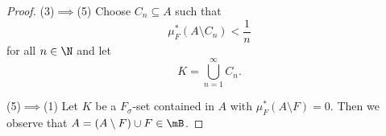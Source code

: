 \documentclass[pmath451]{subfiles}
\begin{document}
\begin{proof}
        (3)$\implies$(5) Choose $C_n\subseteq A$ such that
        \begin{equation*}
            \mu_F^{*}\left( A\setminus C_n \right) < \frac{1}{n}
        \end{equation*}
        for all $n\in\N$ and let
        \begin{equation*}
            K = \bigcup^{\infty}_{n=1} C_n.
        \end{equation*}

        (5)$\implies$(1) Let $K$ be a $F_{\sigma}$-set contained in $A$ with $\mu_F^{*}\left( A\setminus F \right) = 0$. Then we observe that $A = \left( A\setminus F \right)\cup F\in\mB$.
        
        \noindent
        \begin{minipage}{\textwidth}
        \end{minipage}
    \end{proof}
    
    
    
    
    
    
    
    
    
    
    
    
    
    
    
    
    
    
    
    
    
    
    
    
    
    
    
    
\end{document}
